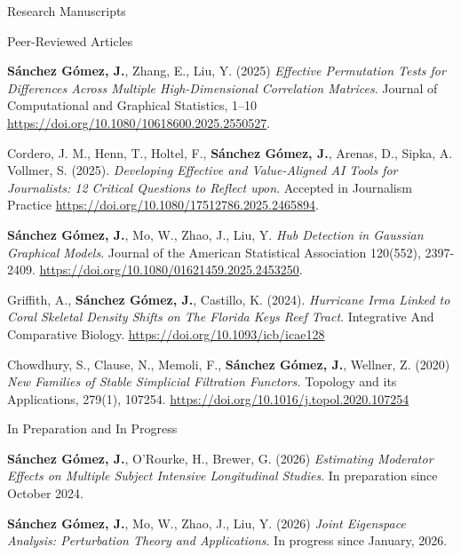 \documentclass{resume_customized} %
\begin{document}
\begin{rSection}{Research Manuscripts}
       
    \begin{rSubsection}{Peer-Reviewed Articles}{}{}
	
	
	\item {\bf Sánchez Gómez, J.}, Zhang, E., Liu, Y. (2025) \textit{Effective Permutation Tests for Differences Across Multiple High-Dimensional Correlation Matrices}. Journal of Computational and Graphical Statistics, 1–10 \url{https://doi.org/10.1080/10618600.2025.2550527}.

	\item Cordero, J. M., Henn, T., Holtel, F., {\bf Sánchez Gómez, J.}, Arenas, D., Sipka, A. Vollmer, S. (2025). \textit{Developing Effective and Value-Aligned AI Tools for Journalists: 12 Critical Questions to Reflect upon}. Accepted in Journalism Practice \url{https://doi.org/10.1080/17512786.2025.2465894}.

	\item {\bf Sánchez Gómez, J.}, Mo, W., Zhao, J., Liu, Y. \textit{Hub Detection in Gaussian Graphical Models}. Journal of the American Statistical Association 120(552), 2397-2409. \url{https://doi.org/10.1080/01621459.2025.2453250}.
 

	\item Griffith, A., \textbf{ Sánchez Gómez, J.}, Castillo, K. (2024). \textit{Hurricane Irma Linked to Coral Skeletal Density Shifts on The Florida Keys Reef Tract}.  Integrative And Comparative Biology. \url{https://doi.org/10.1093/icb/icae128}
	
	
	\item Chowdhury, S., Clause, N., Memoli, F., {\bf Sánchez Gómez, J.}, Wellner, Z. (2020) {\it New Families of Stable Simplicial Filtration Functors.} Topology and its Applications, 279(1), 107254. \url{https://doi.org/10.1016/j.topol.2020.107254}
	
    \end{rSubsection}
    
    \begin{rSubsection}{In Preparation and In Progress}{}{}
    			
		\item {\bf Sánchez Gómez, J.}, O'Rourke, H., Brewer, G. (2026) {\it Estimating Moderator Effects on Multiple Subject Intensive Longitudinal Studies}. In preparation since October 2024.    	
		
    	\item {\bf Sánchez Gómez, J.}, Mo, W., Zhao, J., Liu, Y. (2026) {\it Joint Eigenspace Analysis: Perturbation Theory and Applications}. In progress since January, 2026.
    	

\end{rSubsection}
\end{rSection}
\end{document}
